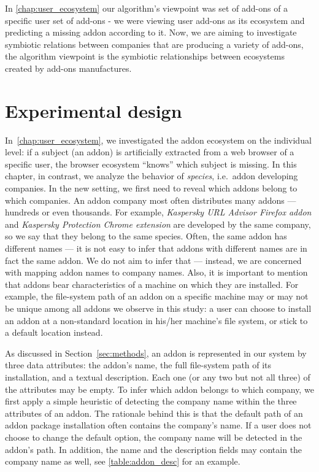 \documentclass[11pt,oneside]{book}
\let\Oldsection\section
\renewcommand{\section}{\FloatBarrier\Oldsection}
\begin{document}
In \autoref{chap:user_ecosystem} our algorithm's viewpoint was set of add-ons of a specific user set of add-ons - we were viewing user add-ons as its ecosystem and predicting a missing addon according to it. Now, we are aiming to investigate symbiotic relations between companies that are producing a variety of add-ons, the algorithm viewpoint is the symbiotic relationships between ecosystems created by add-ons manufactures.
\fi

\section{Experimental design}
\label{sec:experiment_des}

In~\autoref{chap:user_ecosystem}, we investigated the addon ecosystem on the individual level: if a subject (an addon) is artificially extracted from a web browser of a specific user, the browser ecosystem ``knows'' which subject is missing. In this chapter, in contrast, we analyze the behavior of \emph{species}, i.e.~addon developing companies. In the new setting, we first need to reveal which addons belong to which companies. An addon company most often distributes many addons --- hundreds or even thousands. For example, \emph{Kaspersky URL Advisor Firefox addon} and \emph{Kaspersky Protection Chrome extension} are developed by the same company, so we say that they belong to the same species. Often, the same addon has different names --- it is not easy to infer that addons with different names are in fact the same addon. We do not aim to infer that --- instead, we are concerned with mapping addon names to company names. Also, it is important to mention that addons bear characteristics of a machine on which they are installed. For example, the file-system path of an addon on a specific machine may or may not be unique among all addons we observe in this study: a user can choose to install an addon at a non-standard location in his/her machine's file system, or stick to a default location instead.

As discussed in Section~\ref{sec:methods}, an addon is represented in our system by three data attributes: the addon's name, the full file-system path of its installation, and a textual description. Each one (or any two but not all three) of the attributes may be empty. To infer which addon belongs to which company, we first apply a simple heuristic of detecting the company name within the three attributes of an addon. The rationale behind this is that the default path of an addon package installation often contains the company's name. If a user does not choose to change the default option, the company name will be detected in the addon's path. In addition, the name and the description fields may contain the company name as well, see \autoref{table:addon_desc} for an example.
\end{document}
